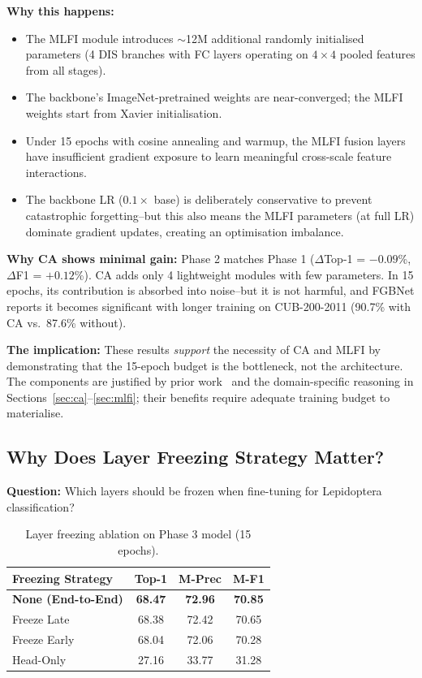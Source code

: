 \documentclass[10pt, twocolumn]{article}
\begin{document}
\textbf{Why this happens:}
\begin{itemize}[leftmargin=*, topsep=2pt, itemsep=1pt]
    \item The MLFI module introduces $\sim$12M additional randomly initialised parameters (4 DIS branches with FC layers operating on $4\times4$ pooled features from all stages).
    \item The backbone's ImageNet-pretrained weights are near-converged; the MLFI weights start from Xavier initialisation.
    \item Under 15 epochs with cosine annealing and warmup, the MLFI fusion layers have insufficient gradient exposure to learn meaningful cross-scale feature interactions.
    \item The backbone LR ($0.1\times$ base) is deliberately conservative to prevent catastrophic forgetting--but this also means the MLFI parameters (at full LR) dominate gradient updates, creating an optimisation imbalance.
\end{itemize}

\textbf{Why CA shows minimal gain:} Phase 2 matches Phase 1 ($\Delta$Top-1 = $-0.09$\%, $\Delta$F1 = $+0.12$\%). CA adds only 4 lightweight modules with few parameters. In 15 epochs, its contribution is absorbed into noise--but it is not harmful, and FGBNet reports it becomes significant with longer training on CUB-200-2011 (90.7\% with CA vs.\ 87.6\% without).

\textbf{The implication:} These results \emph{support} the necessity of CA and MLFI by demonstrating that the 15-epoch budget is the bottleneck, not the architecture. The components are justified by prior work~\cite{yuan2025fgbnet, hou2021coordinate} and the domain-specific reasoning in Sections~\ref{sec:ca}--\ref{sec:mlfi}; their benefits require adequate training budget to materialise.

\subsection{Why Does Layer Freezing Strategy Matter?}

\textbf{Question:} Which layers should be frozen when fine-tuning for Lepidoptera classification?

\begin{table}[H]
\centering
\caption{Layer freezing ablation on Phase 3 model (15 epochs).}
\label{tab:unit3}
\small
\begin{tabular}{@{}lccc@{}}
\toprule
\textbf{Freezing Strategy} & \textbf{Top-1} & \textbf{M-Prec} & \textbf{M-F1} \\
\midrule
\textbf{None (End-to-End)} & \textbf{68.47} & \textbf{72.96} & \textbf{70.85} \\
Freeze Late              & 68.38 & 72.42 & 70.65 \\
Freeze Early             & 68.04 & 72.06 & 70.28 \\
Head-Only                & 27.16 & 33.77 & 31.28 \\
\bottomrule
\end{tabular}
\end{table}
\end{document}
